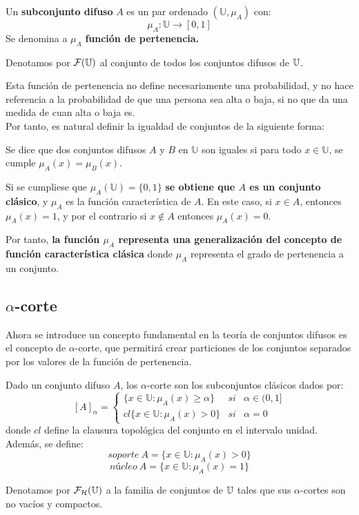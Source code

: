 \begin{definicion}
  \label{def:subconjunto_difuso}
  
  Un \textbf{subconjunto difuso} $A$ es un par ordenado $(\mathbb{U}, \mu_A)$ con:
  \[
  \mu_A : \mathbb{U} \longrightarrow [0,1]
  \]
  Se denomina a $\mu_A$ \textbf{función de pertenencia.}
\end{definicion}
Denotamos por $\mathcal{F}(\mathbb U)$ al conjunto de todos los conjuntos difusos de $\mathbb U$.

Esta función de pertenencia no define necesariamente una probabilidad, y no hace referencia a la probabilidad de que una persona sea alta o baja, si no que da una medida de cuan alta o baja es.\\ 

Por tanto, es natural definir la igualdad de conjuntos de la siguiente forma:

\begin{definicion}
  \label{def:igualdad}
  Se dice que dos conjuntos difusos $A$ y $B$ en $\mathbb{U}$ son iguales si para todo $x \in \mathbb{U}$, se cumple $\mu_A(x) = \mu_B(x)$.
\end{definicion}

Si se cumpliese que $\mu_A(\mathbb{U})=\{0, 1\}$ \textbf{se obtiene que $A$ es un conjunto clásico}, y $\mu_A$ es la función característica de $A$. En este caso, si $x \in A$, entonces $\mu_A(x)=1$, y por el contrario si $x \notin A$ entonces $\mu_A(x)=0$.

Por tanto, \textbf{la función $\mu_A$ representa una generalización del concepto de función característica clásica} donde $\mu_A$ representa el grado de pertenencia a un conjunto.

\subsection{$\alpha$-corte}
Ahora se introduce un concepto fundamental en la teoría de conjuntos difusos es el concepto de $\alpha$-corte, que permitirá crear particiones de los conjuntos separados por los valores de la función de pertenencia.
\begin{definicion}
  \label{def:alpha_corte}
  Dado un conjunto difuso $A$, los $\alpha$-corte son los subconjuntos clásicos dados por:
  \[
    [A]_\alpha = \left\{
    \begin{array}{ccc}
      \{x \in \mathbb{U} : \mu_A(x) \geq \alpha \} & si & \alpha \in (0, 1] \\
      cl\{x \in \mathbb{U} : \mu_A(x) > 0\} & si & \alpha=0
    \end{array}
    \right.
    \]
    donde $cl$ define la clausura topológica del conjunto en el intervalo unidad. Además, se define:
    \[
    soporte ~ A = \{x \in \mathbb{U} : \mu_A(x) > 0 \}
    \]
    \[
    núcleo ~ A = \{x \in \mathbb{U} : \mu_A(x) = 1 \}
    \]
\end{definicion}
Denotamos por $\mathcal{F}_\mathcal{H}(\mathbb U)$ a la familia de conjuntos de $\mathbb U$ tales que sus $\alpha$-cortes son no vacíos y compactos.

